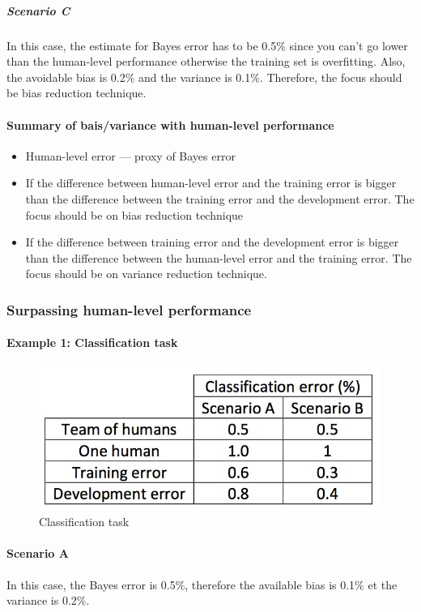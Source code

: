 \documentclass[UTF8]{article}
\begin{document}
\subparagraph{Scenario C}
In this case, the estimate for Bayes error has to be 0.5\% since you can't go lower than the
human-level performance otherwise the training set is overfitting. Also, the avoidable bias is
0.2\% and the variance is 0.1\%. Therefore, the focus should be bias reduction technique.

\paragraph{Summary of bais/variance with human-level performance}
\begin{itemize}
    \item Human-level error --- proxy of Bayes error
    \item If the difference between human-level error and the training error is bigger than the
    difference between the training error and the development error. The focus should be on bias
    reduction technique
    \item If the difference between training error and the development error is bigger than the
    difference between the human-level error and the training error. The focus should be on
    variance reduction technique.
\end{itemize}

\subsubsection{Surpassing human-level performance}
\paragraph{Example 1: Classification task}
\begin{figure}[htb]
    \centering
    \includegraphics[width=30em]{figures/surpass-human-level}
    \caption{Classification task}
    \label{fig:surpass-human-level}
\end{figure}

\paragraph{Scenario A}
In this case, the Bayes error is 0.5\%, therefore the available bias is 0.1\% et the variance is
0.2\%.
\end{document}
